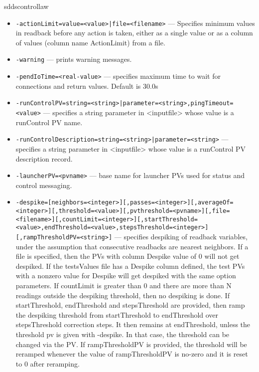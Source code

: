 \begin{sddsprog}{sddscontrollaw}
\begin{itemize}
  \item {\tt -actionLimit=value=<value>|file=<filename>} --- Specifies minimum values in readback before any action is
               taken, either as a single value or as a column of values
               (column name ActionLimit) from a file.
  \item {\tt -warning} --- prints warning messages.
  \item {\tt -pendIoTime=<real-value>} --- specifies maximum time to wait for connections and
               return values.  Default is 30.0s
  \item {\tt -runControlPV=string=<string>|parameter=<string>,pingTimeout=<value>} --- specifies a string parameter in <inputfile> whose value
               is a runControl PV name.
  \item {\tt -runControlDescription=string=<string>|parameter=<string>} ---
               specifies a string parameter in <inputfile> whose value
               is a runControl PV description record.
  \item {\tt -launcherPV=<pvname>} --- base name for launcher PVs used for status and control messaging.
  \item {\tt -despike=[neighbors=<integer>][,passes=<integer>][,averageOf=<integer>][,threshold=<value>][,pvthreshold=<pvname>][,file=<filename>][,countLimit=<integer>][,startThreshold=<value>,endThreshold=<value>,stepsThreshold=<integer>][,rampThresholdPV=<string>]} ---
                specifies despiking of readback variables,
               under the assumption
               that consecutive readbacks are nearest neighbors. If a file is
               specified, then the PVs with column Despike value of 0 will not
               get despiked. If the testsValues file has a Despike column defined,
               the test PVs with a nonzero value for Despike will get despiked
               with the same option parameters. If countLimit is greater than 0
               and there are more than N readings outside the despiking threshold,
               then no despiking is done.
               If startThreshold, endThreshold and stepsThreshold
               are provided, then ramp the despiking threshold from startThreshold to
               endThreshold over stepsThreshold correction steps. It then remains at
               endThreshold, unless the threshold pv is given with -despike.
               In that case, the threshold can be changed via the PV.
               If rampThresholdPV is provided, the threshold will be reramped whenever
               the value of rampThresholdPV is no-zero and it is reset to 0 after reramping.

\end{itemize}
\end{sddsprog}

